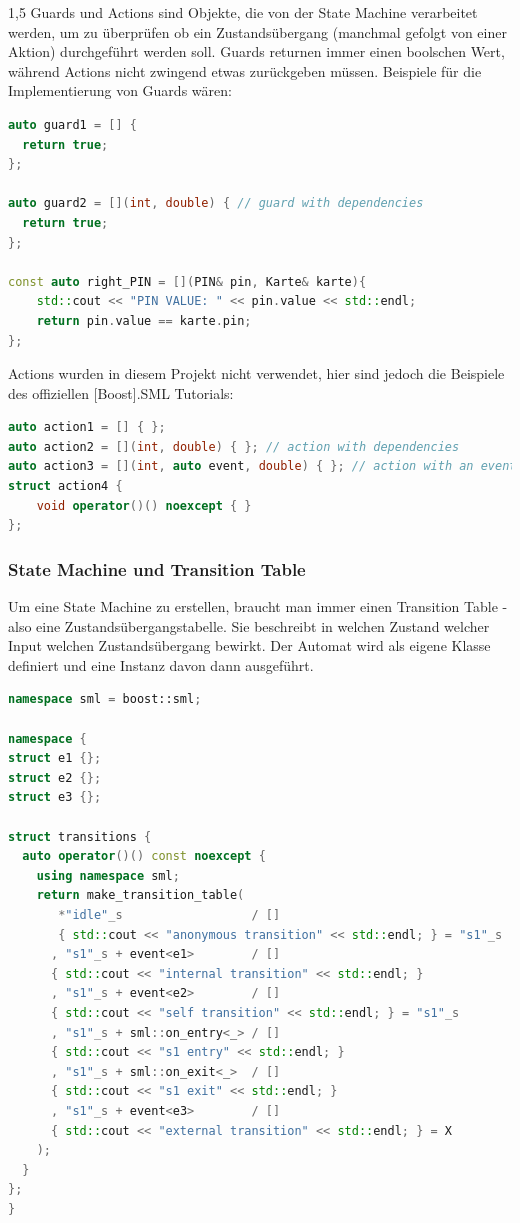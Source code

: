 \documentclass[a4paper]{article}
\begin{document}
\begin{spacing}{1,5}
Guards und Actions sind Objekte, die von der State Machine verarbeitet werden, um zu überprüfen ob ein Zustandsübergang (manchmal gefolgt von einer Aktion) durchgeführt werden soll. Guards returnen immer einen boolschen Wert, während Actions nicht zwingend etwas zurückgeben müssen.
\newline\newline
Beispiele für die Implementierung von Guards wären:

\begin{lstlisting}[language=c++]
auto guard1 = [] {
  return true;
};

auto guard2 = [](int, double) { // guard with dependencies
  return true;
};

const auto right_PIN = [](PIN& pin, Karte& karte){
    std::cout << "PIN VALUE: " << pin.value << std::endl;
    return pin.value == karte.pin;
};
\end{lstlisting}
Actions wurden in diesem Projekt nicht verwendet, hier sind jedoch die Beispiele des offiziellen [Boost].SML Tutorials:

\begin{lstlisting}[language=c++]
auto action1 = [] { };
auto action2 = [](int, double) { }; // action with dependencies
auto action3 = [](int, auto event, double) { }; // action with an event and dependencies
struct action4 {
    void operator()() noexcept { }
};
\end{lstlisting}

\newpage

\subsubsection{State Machine und Transition Table}

Um eine State Machine zu erstellen, braucht man immer einen Transition Table - also eine Zustandsübergangstabelle. Sie beschreibt in welchen Zustand welcher Input welchen Zustandsübergang bewirkt. Der Automat wird als eigene Klasse definiert und eine Instanz davon dann ausgeführt.

\begin{lstlisting}[language=c++]
namespace sml = boost::sml;

namespace {
struct e1 {};
struct e2 {};
struct e3 {};

struct transitions {
  auto operator()() const noexcept {
    using namespace sml;
    return make_transition_table(
       *"idle"_s                  / []
       { std::cout << "anonymous transition" << std::endl; } = "s1"_s
      , "s1"_s + event<e1>        / []
      { std::cout << "internal transition" << std::endl; }
      , "s1"_s + event<e2>        / []
      { std::cout << "self transition" << std::endl; } = "s1"_s
      , "s1"_s + sml::on_entry<_> / []
      { std::cout << "s1 entry" << std::endl; }
      , "s1"_s + sml::on_exit<_>  / []
      { std::cout << "s1 exit" << std::endl; }
      , "s1"_s + event<e3>        / []
      { std::cout << "external transition" << std::endl; } = X
    );
  }
};
}  


\end{lstlisting}
\end{spacing}
\end{document}
